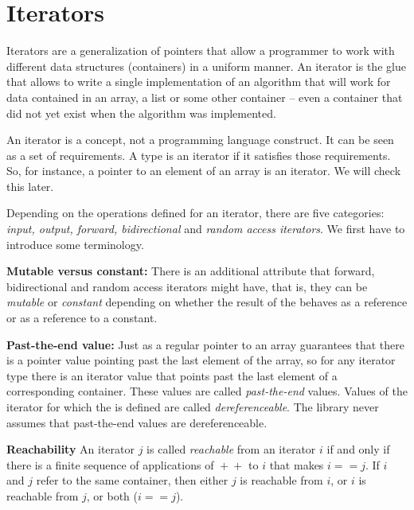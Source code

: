 

\cleardoublepage
\chapter{Iterators\label{chapterIterators}}

Iterators are a generalization of pointers that allow a programmer to
work with different data structures (containers) in a uniform manner.
An iterator is the glue that allows to write a single implementation of
an algorithm that will work for data contained in an array, a list or
some other container -- even a container that did not yet exist when the
algorithm was implemented.

An iterator is a concept, not a programming language construct. It can
be seen as a set of requirements. A type is an iterator if it satisfies
those requirements. So, for instance, a pointer to an element of an
array is an iterator. We will check this later.

Depending on the operations defined for an iterator, there are five
categories: {\em input, output, forward, bidirectional} and {\em
random access iterators}. We first have to introduce some terminology.

{\bf Mutable versus constant:}
There is an additional attribute that forward, bidirectional and
random access iterators might have, that is, they can be {\em mutable}
or {\em constant} depending on whether the result of the 
 behaves as a reference or as a reference to a constant.

{\bf Past-the-end value:}
Just as a regular pointer to an array guarantees that there is a
pointer value pointing past the last element of the array, so for any
iterator type there is an iterator value that points past the last
element of a corresponding container. These values are called {\em
past-the-end} values. Values of the iterator for which the 
is defined are called {\em dereferenceable}.
The library never assumes that past-the-end values are
dereferenceable.

{\bf Reachability} An iterator $j$ is called {\em reachable} from an
iterator $i$ if and only if there is a finite sequence of applications
of $\!+\!+$ to $i$ that makes $i == j$. If $i$ and
$j$ refer to the same container, then either $j$ is reachable from
$i$, or $i$ is reachable from $j$, or both ($i == j$).

